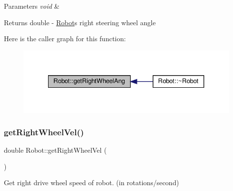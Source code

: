 \begin{DoxyParams}{Parameters}
{\em void} & \\
\hline
\end{DoxyParams}
\begin{DoxyReturn}{Returns}
double -\/ \hyperlink{classRobot}{Robot}\textquotesingle{}s right steering wheel angle 
\end{DoxyReturn}
Here is the caller graph for this function\+:
\nopagebreak
\begin{figure}[H]
\begin{center}
\leavevmode
\includegraphics[width=328pt]{classRobot_aaa3dd6bad00b406b62bb58af2dd37ca4_icgraph}
\end{center}
\end{figure}
\mbox{\label{classRobot_a4596767fd5ee2f6a923523a298d584fb}} 
\subsubsection{\texorpdfstring{get\+Right\+Wheel\+Vel()}{getRightWheelVel()}}
{\footnotesize\ttfamily double Robot\+::get\+Right\+Wheel\+Vel (\begin{DoxyParamCaption}{ }\end{DoxyParamCaption})}



Get right drive wheel speed of robot. (in rotations/second) 


